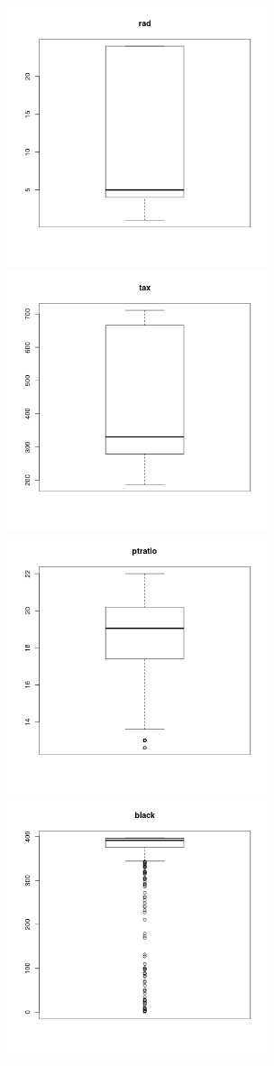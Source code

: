 \message{ !name(hw1.tex)}\documentclass{article}
\begin{document}
\includegraphics[width=3in]{9.png}
\includegraphics[width=3in]{10.png}
\includegraphics[width=3in]{11.png}
\includegraphics[width=3in]{12.png}
\end{document}

